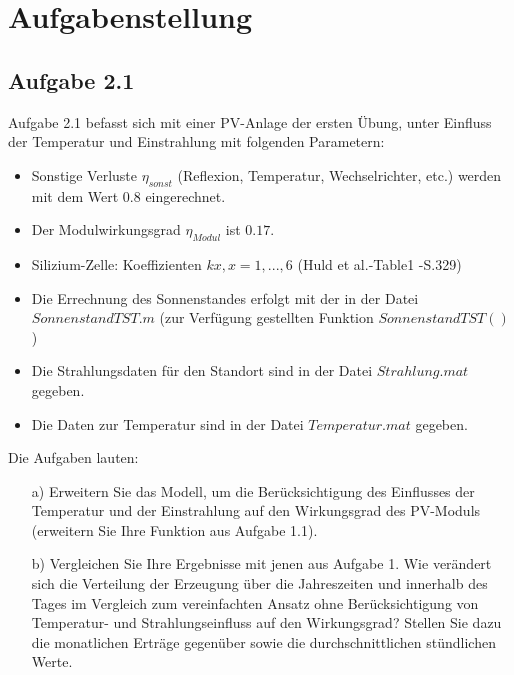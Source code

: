 \documentclass[a4paper,12pt]{article}
\begin{document}
	
	
	\newpage
	\tableofcontents
	
	\newpage
	\section{Aufgabenstellung}
	\subsection{Aufgabe 2.1}
	Aufgabe 2.1 befasst sich mit einer PV-Anlage der ersten Übung, unter Einfluss der Temperatur und Einstrahlung mit folgenden Parametern:
	\begin{itemize}
		\item Sonstige Verluste $\eta_{sonst}$ (Reflexion, Temperatur, Wechselrichter, etc.) werden mit dem Wert $0.8$ eingerechnet.				\item Der Modulwirkungsgrad $\eta_{Modul}$ ist $0.17$.
		\item Silizium-Zelle: Koeffizienten $kx, x = 1, ... , 6$ (Huld et al.-Table1 -S.329)
		\item Die Errechnung des Sonnenstandes erfolgt mit der in der Datei $SonnenstandTST.m$ (zur Verfügung gestellten Funktion $SonnenstandTST()$ 	)				\item Die Strahlungsdaten für den Standort sind in der Datei $Strahlung.mat$ gegeben.
		\item Die Daten zur Temperatur sind in der Datei $Temperatur.mat$ gegeben.
	\end{itemize}
	Die Aufgaben lauten:
	\begin{itemize}
		\item[a)] Erweitern Sie das Modell, um die Berücksichtigung des Einflusses der Temperatur und der
Einstrahlung auf den Wirkungsgrad des PV-Moduls (erweitern Sie Ihre Funktion aus
Aufgabe 1.1).
		\item[b)] Vergleichen Sie Ihre Ergebnisse mit jenen aus Aufgabe 1. Wie verändert sich die Verteilung
der Erzeugung über die Jahreszeiten und innerhalb des Tages im Vergleich zum
vereinfachten Ansatz ohne Berücksichtigung von Temperatur- und Strahlungseinfluss auf
den Wirkungsgrad? Stellen Sie dazu die monatlichen Erträge gegenüber sowie die
durchschnittlichen stündlichen Werte.
	\end{itemize}
\end{document}

